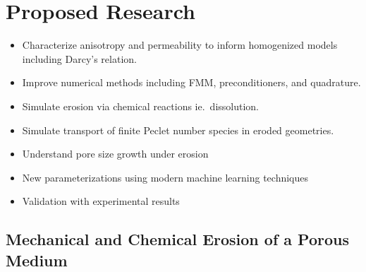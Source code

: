 \documentclass[11pt]{article}
\begin{document}
\section{Proposed Research} 
\begin{itemize}[noitemsep]
  \item Characterize anisotropy and permeability to inform homogenized
    models including Darcy's relation.

  \item Improve numerical methods including FMM, preconditioners, and
    quadrature.

  \item Simulate erosion via chemical reactions ie.~dissolution.

  \item Simulate transport of finite Peclet number species in eroded
    geometries.

  \item Understand pore size growth under erosion

  \item New parameterizations using modern machine learning techniques

  \item Validation with experimental results
\end{itemize}



\subsection{Mechanical and Chemical Erosion of a Porous Medium}
\end{document}
